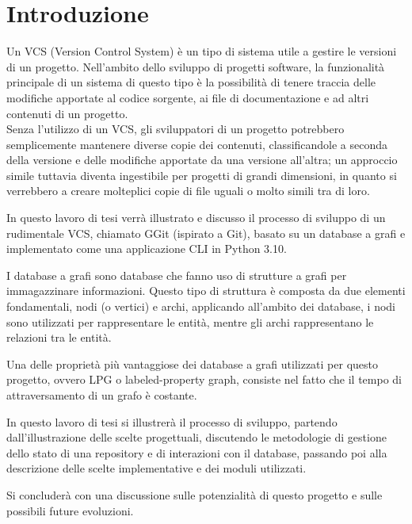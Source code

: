 \chapter*{Introduzione}
\label{chap:intro}
Un VCS (Version Control System) è un tipo di sistema utile a gestire le versioni di un progetto.
Nell'ambito dello sviluppo di progetti software, la funzionalità principale di un sistema di 
questo tipo è la possibilità di tenere traccia delle modifiche apportate al codice sorgente, ai file
di documentazione e ad altri contenuti di un progetto.\\
Senza l'utilizzo di un VCS, gli sviluppatori di un progetto potrebbero semplicemente mantenere diverse 
copie dei contenuti, classificandole a seconda della versione e delle modifiche apportate da una 
versione all'altra; un approccio simile tuttavia diventa ingestibile per progetti di grandi dimensioni,
in quanto si verrebbero a creare molteplici copie di file uguali o molto simili tra di loro.

In questo lavoro di tesi verrà illustrato e discusso il processo di sviluppo di un rudimentale VCS, 
chiamato GGit (ispirato a Git), basato su un database a grafi e implementato come una applicazione CLI
in Python 3.10.

I database a grafi sono database che fanno uso di strutture a grafi per immagazzinare informazioni.
Questo tipo di struttura è composta da due elementi fondamentali, nodi (o vertici) e archi, applicando
all'ambito dei database, i nodi sono utilizzati per rappresentare le entità, mentre gli archi
rappresentano le relazioni tra le entità.

Una delle proprietà più vantaggiose dei database a grafi utilizzati per questo progetto, ovvero 
LPG o labeled-property graph, consiste nel fatto che il tempo di attraversamento di un grafo 
è costante\cite{traversaltime}.

In questo lavoro di tesi si illustrerà il processo di sviluppo, partendo dall'illustrazione delle scelte progettuali, discutendo le metodologie di gestione dello stato di una repository e di interazioni con il database, passando poi alla descrizione delle scelte implementative e dei moduli utilizzati.

Si concluderà con una discussione sulle potenzialità di questo progetto e sulle possibili future evoluzioni.